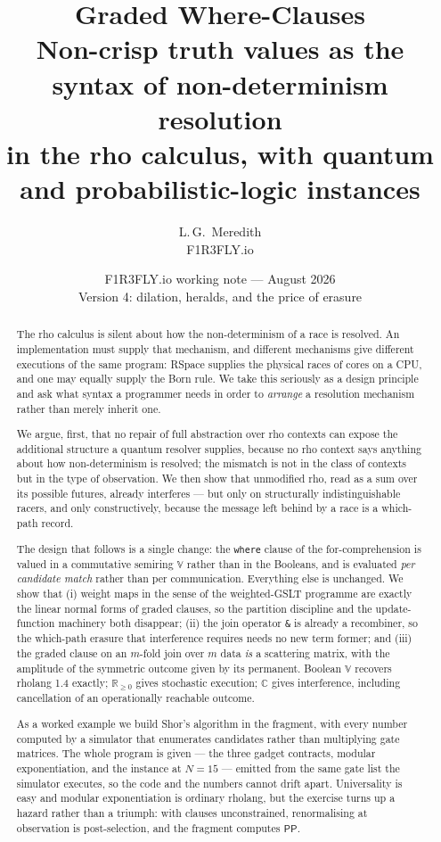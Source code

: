 \documentclass[11pt,a4paper]{article}
\title{\bfseries Graded Where-Clauses\\[4pt]
\large Non-crisp truth values as the syntax of non-determinism resolution\\
in the rho calculus, with quantum and probabilistic-logic instances}
\author{L.\,G.\ Meredith\\ \small F1R3FLY.io}
\date{F1R3FLY.io working note --- August 2026\\[2pt]
\normalsize Version 4: dilation, heralds, and the price of erasure}
\theoremstyle{plain}
\theoremstyle{definition}
\theoremstyle{remark}
\newcommand{\V}{\mathbb{V}}
\newcommand{\Rnn}{\mathbb{R}_{\geq 0}}
\newcommand{\Cx}{\mathbb{C}}
\begin{document}
\maketitle

\begin{abstract}
The rho calculus is silent about how the non-determinism of a race is resolved.
An implementation must supply that mechanism, and different mechanisms give
different executions of the same program: RSpace supplies the physical races of
cores on a CPU, and one may equally supply the Born rule. We take this seriously
as a design principle and ask what syntax a programmer needs in order to
\emph{arrange} a resolution mechanism rather than merely inherit one.

We argue, first, that no repair of full abstraction over rho contexts can expose
the additional structure a quantum resolver supplies, because no rho context says
anything about how non-determinism is resolved; the mismatch is not in the class
of contexts but in the type of observation. We then show that unmodified rho,
read as a sum over its possible futures, already interferes --- but only on
structurally indistinguishable racers, and only constructively, because the
message left behind by a race is a which-path record.

The design that follows is a single change: the \texttt{where} clause of the
for-comprehension is valued in a commutative semiring $\V$ rather than in the
Booleans, and is evaluated \emph{per candidate match} rather than per
communication. Everything else is unchanged. We show that (i) weight maps in the
sense of the weighted-GSLT programme are exactly the linear normal forms of
graded clauses, so the partition discipline and the update-function machinery
both disappear; (ii) the join operator \texttt{\&} is already a recombiner, so
the which-path erasure that interference requires needs no new term former; and
(iii) the graded clause on an $m$-fold join over $m$ data \emph{is} a scattering
matrix, with the amplitude of the symmetric outcome given by its permanent.
Boolean $\V$ recovers rholang 1.4 exactly; $\Rnn$ gives stochastic execution;
$\Cx$ gives interference, including cancellation of an operationally reachable
outcome.

As a worked example we build Shor's algorithm in the fragment, with every number
computed by a simulator that enumerates candidates rather than multiplying gate
matrices. The whole program is given --- the three gadget contracts, modular
exponentiation, and the instance at $N=15$ --- emitted from the same gate list
the simulator executes, so the code and the numbers cannot drift apart.
Universality is easy and modular exponentiation is ordinary rholang,
but the exercise turns up a hazard rather than a triumph: with clauses
unconstrained, renormalising at observation is post-selection, and the fragment
computes $\mathsf{PP}$.


\end{abstract}
\end{document}
